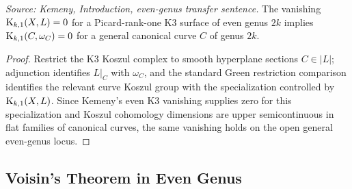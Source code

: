 \begin{lemma}
  \label{lem:kemeny_even_k3_section_to_general_curve}
  \textit{Source: Kemeny, Introduction, even-genus transfer sentence.}
  The vanishing \(\mathrm{K}_{k,1}(X,L)=0\) for a Picard-rank-one K3 surface of even
  genus \(2k\) implies \(\mathrm{K}_{k,1}(C,\omega_C)=0\) for a general canonical curve
  \(C\) of genus \(2k\).
\end{lemma}
\begin{proof}
  Restrict the K3 Koszul complex to smooth hyperplane sections \(C\in |L|\);
  adjunction identifies \(L|_C\) with \(\omega_C\), and the standard Green
  restriction comparison identifies the relevant curve Koszul group with the
  specialization controlled by \(\mathrm{K}_{k,1}(X,L)\).  Since Kemeny's even K3
  vanishing supplies zero for this specialization and Koszul cohomology
  dimensions are upper semicontinuous in flat families of canonical curves, the
  same vanishing holds on the open general even-genus locus.
\end{proof}

\subsection{Voisin's Theorem in Even Genus}

